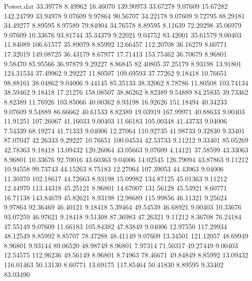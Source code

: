 \begin{filecontents}{Power.dat}
  33.39778    8.49962   16.46070  139.90973
  33.67278    9.07609   15.67282  142.24799
  33.94978    9.07609    9.97864   90.56707
  34.22178    9.07609    9.72795   88.29181
  34.49277    8.89595    8.97589   79.84904
  34.76578    8.89595    8.11639   72.20298
  35.06979    9.07609   10.33676   93.81744
  35.34379    9.22021    9.04752   83.42001
  35.61579    9.00403   11.84089  106.61577
  35.89079    8.85992   12.66457  112.20708
  36.16279    8.60771   17.32019  149.08725
  36.43179    8.67977   17.71413  153.75462
  36.70679    8.96801    9.58470   85.95566
  36.97879    9.29227    8.86845   82.40805
  37.25179    8.93198   13.91801  124.31534
  37.49962    9.29227   11.80507  109.69593
  37.77262    9.18418   10.76651   98.88161
  38.04862    9.04006    9.44145   85.35133
  38.32062    8.78786   11.80508  103.74134
  38.59462    9.18418   17.21276  158.08507
  38.86262    8.82389    9.54889   84.25835
  39.73362    8.82389   11.76926  103.85066
  40.00362    8.93198   16.92626  151.18494
  40.34233    9.07609    9.54889   86.66662
  40.61533    8.82389   19.03919  167.99971
  40.88633    9.00403   11.91251  107.26067
  41.16033    9.00403   11.66183  105.00348
  41.43733    9.04006    7.54339   68.19274
  41.71333    9.04006   12.27064  110.92735
  41.98733    9.32830    9.33401   87.07047
  42.26333    9.29227   10.76651  100.04534
  42.53733    9.11212    9.33401   85.05269
  42.78363    9.18418   13.09432  120.26064
  43.05663    9.07609    4.14121   37.58599
  43.33063    8.96801   10.33676   92.70016
  43.60363    9.04006   14.02545  126.79094
  43.87863    9.11212   10.94558   99.73743
  44.15263    8.75183   12.27064  107.39053
  44.43963    9.04006   11.30370  102.18617
  44.72663    8.93198   15.09982  134.87125
  45.01363    9.11212   12.44970  113.44318
  45.25121    8.96801   14.67007  131.56128
  45.53921    8.60771   16.71138  143.84679
  45.82621    8.93198   12.98689  115.99856
  46.11321    9.25624    9.97864   92.36469
  46.40121    9.18418    5.39464   49.54539
  46.68921    9.00403   10.33676   93.07259
  46.97621    9.18418    9.51308   87.36983
  47.26321    9.11212    8.36708   76.24184
  47.55149    9.07609   11.66183  105.84382
  47.83849    9.04006   12.97550  117.29934
  48.12549    8.85992    8.85707   78.47288
  48.41149    9.07609   13.34501  121.12057
  48.69949    8.96801    9.93144   89.06520
  48.98749    8.96801    7.97314   71.50317
  49.27449    9.00403   12.54575  112.96236
  49.56149    8.96801    8.74963   78.46671
  49.84849    8.85992   13.09432  116.01463
  50.13130    8.60771   13.69175  117.85464
  50.41830    8.89595    9.33402   83.03490

\end{filecontents}
